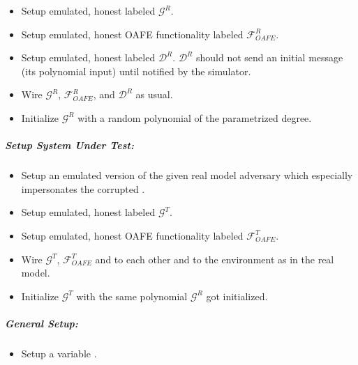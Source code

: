 \begin{itemize}

  \item Setup emulated, honest \JWpOne{} labeled $\mathcal{G}^R$.

  \item Setup emulated, honest OAFE functionality \JWfuncSymOAFE{}
    labeled $\mathcal{F}^R_{OAFE}$.

  \item Setup emulated, honest \JWpTwo{} labeled $\mathcal{D}^R$.
    $\mathcal{D}^R$ should not send an initial message (its polynomial input)
    until notified by the simulator.

  \item Wire $\mathcal{G}^R$, $\mathcal{F}^R_{OAFE}$, and $\mathcal{D}^R$ as
    usual.

  \item Initialize $\mathcal{G}^R$ with a random polynomial of the parametrized
    degree.

\end{itemize}


\subparagraph{Setup System Under Test:}

\begin{itemize}

  \item Setup an emulated version of the given real model adversary
    \JWadv{} which especially impersonates the corrupted \JWpTwo{}.

  \item Setup emulated, honest \JWpOne{} labeled $\mathcal{G}^T$.

  \item Setup emulated, honest OAFE functionality \JWfuncSymOAFE{}
    labeled $\mathcal{F}^T_{OAFE}$.

  \item Wire $\mathcal{G}^T$, $\mathcal{F}^T_{OAFE}$ and \JWadv{} to each other
    and \JWadv{} to the environment as in the real model.

  \item Initialize $\mathcal{G}^T$ with the same polynomial $\mathcal{G}^R$ got
    initialized.

\end{itemize}


\subparagraph{General Setup:}

\begin{itemize}

  \item Setup a variable .

\end{itemize}


